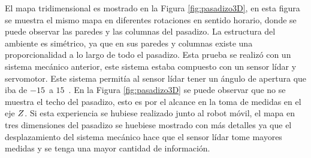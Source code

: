 
El mapa tridimensional es mostrado en la Figura \ref{fig:pasadizo3D}, en esta 
figura se muestra el mismo mapa en diferentes rotaciones en sentido horario, 
donde se puede observar las paredes y las columnas del pasadizo. La estructura 
del ambiente es simétrico, ya que en sus paredes y columnas existe una 
proporcionalidad a lo largo de todo el pasadizo. Esta prueba se realizó con 
un sistema mecánico anterior, este sistema estaba compuesto con un sensor lídar 
y servomotor. Este sistema permitía al sensor lídar tener un ángulo de apertura 
que iba de $-15$~\grad a $15$~\grad. En la Figura \ref{fig:pasadizo3D} se
puede observar que no se muestra el techo del pasadizo, esto es por el alcance en 
la toma de medidas en el eje $\mathnormal Z$. Si esta experiencia se hubiese realizado 
junto al robot móvil, el mapa en tres dimensiones del pasadizo se huebiese mostrado
con más detalles ya que el desplazamiento del sistema mecánico hace que el sensor
lídar tome mayores medidas y se tenga una mayor cantidad de información.


